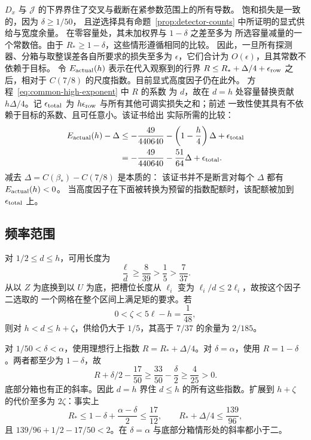 \(D_x\) 与 \(\mathcal J\) 的下界界住了交叉与截断在紧参数范围上的所有导数。
饱和损失是一致的，因为 \(\delta\ge1/50\)，
且逆选择具有命题~\ref{prop:detector-counts} 中所证明的显式供给与宽度余量。
在零容量处，其未加权界与 \(1-\delta\) 之差至多为
所选容量减量的一个常数倍。由于
\(R_*\ge1-\delta\)，这些情形遵循相同的比较。
因此，一旦所有探测器、分箱与取整误差各自所要求的损失至多为
\(\epsilon\)，它们合计为 \(O(\epsilon)\)，且其常数不依赖于目标。
令 \(E_{\rm actual}(h)\) 表示在代入观察到的行界
\(R\le R_*+\Delta/4+\epsilon_{\rm row}\) 之后，相对于
\(C(7/8)\) 的尺度指数。目前显式高度因子仍在此外。
方程~\eqref{eq:common-high-exponent} 中 \(R\) 的系数
为 \(d\)，故在 \(d=h\) 处容量替换贡献
\(h\Delta/4\)。记 \(\epsilon_{\rm total}\) 为
\(h\epsilon_{\rm row}\) 与所有其他可调实损失之和；前述
一致性使其具有不依赖于目标的系数、且可任意小。该证书给出
实际所需的比较：
\begin{equation}
 \begin{split}
 E_{\rm actual}(h)-\Delta
 &\le-\frac{49}{440640}-\left(1-\frac h4\right)\Delta
       +\epsilon_{\rm total}\\
 &=-\frac{49}{440640}-\frac{51}{64}\Delta
       +\epsilon_{\rm total}.
 \end{split}
 \label{eq:adaptive-endpoint}
\end{equation}
减去 \(\Delta=C(\beta_*)-C(7/8)\) 是本质的：
该证书并不是断言对每个 \(\Delta\) 都有 \(E_{\rm actual}(h)<0\)。
当高度因子在下面被转换为预留的指数配额时，该配额被加到
\(\epsilon_{\rm total}\) 上。

\subsection{频率范围}

对 \(1/2\le d\le h\)，可用长度为
\[
 \frac{\ell}{d}\ge\frac8{39}>\frac15>\frac7{37}.
\]
从以 \(Z\) 为底换到以 \(U\) 为底，把槽位长度从
\(\ell_i\) 变为 \(\ell_i/d\le2\ell_i\)，故按这个因子二选取的
一个网格在整个区间上满足矩的要求。若
\[
 0<\zeta<5\ell-h=\frac1{48},
\]
则对 \(h<d\le h+\zeta\)，供给仍大于
\(1/5\)，其高于 \(7/37\) 的余量为 \(2/185\)。

对 \(1/50<\delta<\alpha\)，使用理想行上指数
\(R=R_*+\Delta/4\)。对 \(\delta=\alpha\)，使用
\(R=1-\delta\)。两者都至少为 \(1-\delta\)，故
\[
 R+\delta/2-\frac{17}{50}
 \ge\frac{33}{50}-\frac{\delta}{2}\ge\frac4{25}>0.
\]
底部分箱也有正的斜率。因此 \(d=h\) 界住
\(d\le h\) 的所有这些指数。扩展到
\(h+\zeta\) 的代价至多为 \(2\zeta\)：事实上
\[
 R_*\le1-\delta+\frac{\alpha-\delta}{2}\le\frac{17}{12},
 \qquad
 R_*+\Delta/4\le\frac{139}{96},
\]
且 \(139/96+1/2-17/50<2\)。在 \(\delta=\alpha\)
与底部分箱情形处的斜率都小于二。

